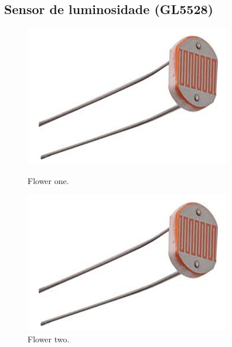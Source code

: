 \newpage

\subsection{Sensor de luminosidade (GL5528)}

\begin{figure}[h]
	\centering
	\begin{minipage}[b]{0.4\textwidth}
		\includegraphics[width=\textwidth]{img/hardware/luminosidade.png}
		\caption{Flower one.}
	\end{minipage}
	\hfill
	\begin{minipage}[b]{0.4\textwidth}
		\includegraphics[width=\textwidth]{img/hardware/luminosidade.png}
		\caption{Flower two.}
	\end{minipage}
\end{figure}




